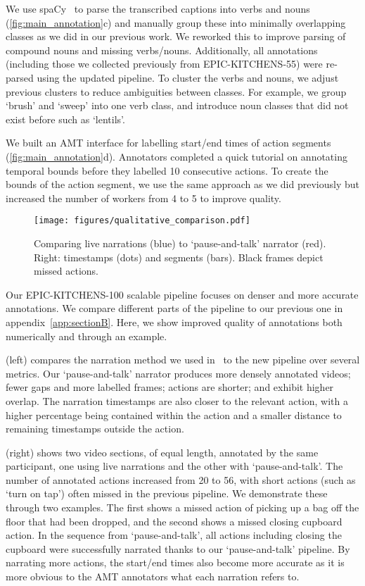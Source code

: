 \RequirePackage{amsmath} \documentclass[runningheads]{llncs}
\newcommand{\chParagraph}[1]{\noindent {\textbf{#1.}} \hspace{6pt}}
\newcommand {\oldDataset} {EPIC-KITCHENS-55{}}
\newcommand {\newDataset} {EPIC-KITCHENS-100}
\newcommand{\annStyle} {`pause-and-talk'{}}
\begin{document}
\chParagraph{(c) Parser}
We use spaCy~\cite{spacy2} to parse the transcribed captions into verbs and nouns (\cref{fig:main_annotation}c) and manually group these into minimally overlapping classes as we did in our previous work.
We reworked this to improve parsing of compound nouns and missing verbs/nouns. Additionally, all annotations (including those we collected previously from \oldDataset) were re-parsed using the updated pipeline.
To cluster the verbs and nouns, we adjust previous clusters to reduce ambiguities between classes. For example, we group `brush' and `sweep' into one verb class, and introduce noun classes that did not exist before such as `lentils'.


\chParagraph{(d) Temporal Annotator}
We built an AMT interface for labelling start/end times of action segments (\cref{fig:main_annotation}d).
Annotators completed a quick tutorial on annotating temporal bounds before they labelled 10 consecutive actions.
To create the bounds of the action segment, we use the same approach as we did previously but increased the number of workers from 4 to 5 to improve quality.


\begin{figure}[t!]
    \centering
    \texttt{[image: figures/qualitative\_comparison.pdf]}
    \caption{Comparing live narrations (blue) to \annStyle{} narrator (red). Right: timestamps (dots) and segments (bars). Black frames depict missed actions.}
    \label{fig:qual_comp_18_20}
\end{figure}




\chParagraph{Quality Improvements}
Our \newDataset{} scalable pipeline focuses on denser and more accurate annotations. We compare different parts of the pipeline to our previous one in appendix~\ref{app:sectionB}.
Here, we show improved quality of annotations both numerically and through an example.

 (left) compares the narration method we used in~\cite{Damen2018EPICKITCHENS} to the new pipeline over several metrics. Our \annStyle{} narrator produces more densely annotated videos; fewer gaps and more labelled frames; actions are shorter; and exhibit higher overlap. 
The narration timestamps are also closer to the relevant action, with a higher percentage being contained within the action and a smaller distance to remaining timestamps outside the action.

 (right) shows two video sections, of equal length, annotated by the same participant, one using live narrations and the other with \annStyle.
The number of annotated actions increased from 20 to 56, with short actions (such as `turn on tap') often missed in the previous pipeline.
We demonstrate these through two examples.
The first shows a missed action of  picking up a bag off the floor that had been dropped, and the second shows a missed closing cupboard action.
In the sequence from \annStyle{}, all actions including closing the cupboard were successfully narrated thanks to our \annStyle{} pipeline. By narrating more actions, the start/end times also become more accurate as it is more obvious to the AMT annotators what each narration refers to.
\end{document}
